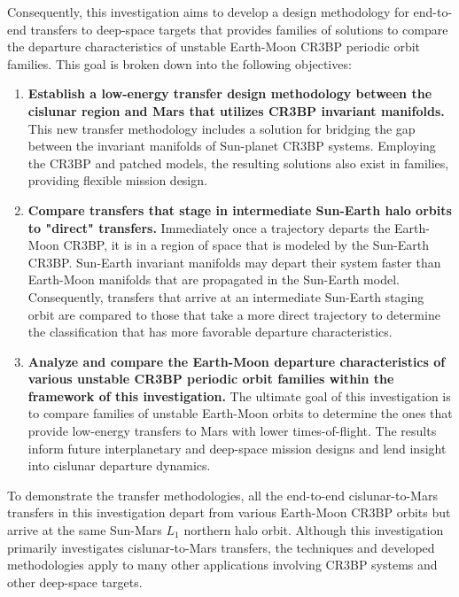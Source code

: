 Consequently, this investigation aims to develop a design methodology for end-to-end transfers to
deep-space targets that provides families of solutions to compare the departure characteristics of
unstable Earth-Moon CR3BP periodic orbit families. This goal is broken down into the following
objectives:
\begin{enumerate}
    \item   \textbf{Establish a low-energy transfer design methodology between the cislunar region
			and Mars that utilizes CR3BP invariant manifolds.} This new transfer methodology
			includes a solution for bridging the gap between the invariant manifolds of Sun-planet
			CR3BP systems. Employing the CR3BP and patched models, the resulting solutions also
			exist in families, providing flexible mission design.
    \item   \textbf{Compare transfers that stage in intermediate Sun-Earth halo orbits to "direct"
			transfers.} Immediately once a trajectory departs the Earth-Moon CR3BP, it is in a
			region of space that is modeled by the Sun-Earth CR3BP. Sun-Earth invariant manifolds
			may depart their system faster than Earth-Moon manifolds that are propagated in the
			Sun-Earth model. Consequently, transfers that arrive at an intermediate Sun-Earth
			staging orbit are compared to those that take a more direct trajectory to determine the
			classification that has more favorable departure characteristics.
    \item   \textbf{Analyze and compare the Earth-Moon departure characteristics of various
			unstable CR3BP periodic orbit families within the framework of this investigation.} The
			ultimate goal of this investigation is to compare families of unstable Earth-Moon
			orbits to determine the ones that provide low-energy transfers to Mars with lower
			times-of-flight. The results inform future interplanetary and deep-space mission
			designs and lend insight into cislunar departure dynamics.

\end{enumerate}
To demonstrate the transfer methodologies, all the end-to-end cislunar-to-Mars transfers in this
investigation depart from various Earth-Moon CR3BP orbits but arrive at the same Sun-Mars $L_{1}$
northern halo orbit. Although this investigation primarily investigates cislunar-to-Mars transfers,
the techniques and developed methodologies apply to many other applications involving CR3BP systems
and other deep-space targets.

